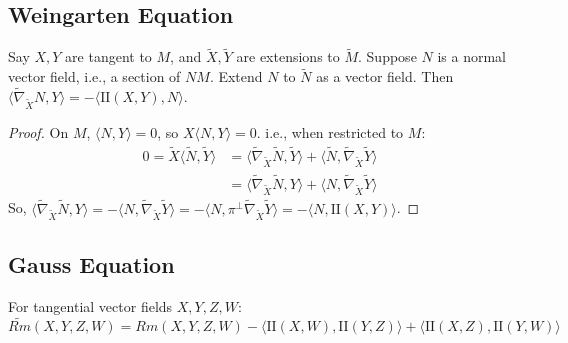\documentclass[11pt, a4paper]{article}
\theoremstyle{plain}
\theoremstyle{definition}
\theoremstyle{remark}
\begin{document}
{\subsection*{Weingarten Equation}
Say $X, Y$ are tangent to $M$, and $\tilde{X}, \tilde{Y}$ are extensions to $\tilde{M}$. Suppose $N$ is a normal vector field, i.e., a section of $NM$. Extend $N$ to $\tilde{N}$ as a vector field.
Then $\langle \tilde{\nabla}_{\tilde{X}} N, Y \rangle = -\langle \mathrm{I\!I}(X,Y), N \rangle$.

\begin{proof}
On $M$, $\langle N, Y \rangle = 0$, so $X\langle N, Y \rangle = 0$. i.e., when restricted to $M$:
\begin{align*}
0 = \tilde{X}\langle \tilde{N}, \tilde{Y} \rangle &= \langle \tilde{\nabla}_{\tilde{X}} \tilde{N}, \tilde{Y} \rangle + \langle \tilde{N}, \tilde{\nabla}_{\tilde{X}} \tilde{Y} \rangle \\
&= \langle \tilde{\nabla}_{\tilde{X}} \tilde{N}, Y \rangle + \langle N, \tilde{\nabla}_{\tilde{X}} \tilde{Y} \rangle
\end{align*}
So, $\langle \tilde{\nabla}_{\tilde{X}} \tilde{N}, Y \rangle = -\langle N, \tilde{\nabla}_{\tilde{X}} \tilde{Y} \rangle = -\langle N, \pi^\perp \tilde{\nabla}_{\tilde{X}} \tilde{Y} \rangle = -\langle N, \mathrm{I\!I}(X,Y) \rangle$.
\end{proof}

\subsection*{Gauss Equation}
For tangential vector fields $X, Y, Z, W$:
\[ \tilde{Rm}(X,Y,Z,W) = Rm(X,Y,Z,W) - \langle \mathrm{I\!I}(X,W), \mathrm{I\!I}(Y,Z) \rangle + \langle \mathrm{I\!I}(X,Z), \mathrm{I\!I}(Y,W) \rangle \]

}
\end{document}
